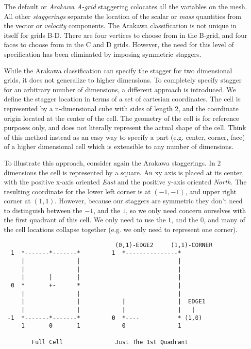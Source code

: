 The default or {\em{Arakawa A-grid}} staggering colocates all the variables on the mesh. All other {\em{staggerings}} separate the location of the scalar or {\em{mass}} quantities from the vector or {\em{velocity}} components. The Arakawa classification is not unique in itself for grids B-D. There are four vertices to choose from in the B-grid, and four faces to choose from in the C and D grids. However, the need for this level of specification has been eliminated by imposing symmetric staggers.

While the Arakawa classification can specify the stagger for two dimensional grids, it does not generalize to higher dimensions. To completely specify stagger for an arbitrary number of dimensions, a different approach is introduced. We define the stagger location in terms of a set of cartesian coordinates. The cell is represented by a n-dimensional cube with sides of length 2, and the coordinate origin located at the center of the cell. The geometry of the cell is for reference purposes only, and does not literally represent the actual shape of the cell. Think of this method instead as an easy way to specify a part (e.g. center, corner, face) of a higher dimensional cell which is extensible to any number of dimensions. 

To illustrate this approach, consider again the Arakawa staggerings. In 2 dimensions the cell is represented by a square. An xy axis is placed at its center, with the positive x-axis oriented {\em East} and the positive y-axis oriented {\em North}. The resulting coordinate for the lower left corner is at $(-1,-1)$, and upper right corner at $(1,1)$.
However, because our staggers are symmetric they don't need to distinguish between the $-1$, and the $1$, so
we only need concern ourselves with the first quadrant of this cell. We only need to use the $1$, and the $0$, and
many of the cell locations collapse together (e.g. we only need to represent one corner). 

\begin{verbatim}
                                (0,1)-EDGE2     (1,1)-CORNER
  1  *-------*-------*         1  *---------------* 
     |               |                            |
     |               |                            | 
     |       |       |                            | 
  0  *       +-      *                            |  
     |               |                            | 
     |               |            |               |  EDGE1
     |               |            |               |   |
 -1  *-------*-------*         0  *----           * (1,0)
    -1       0       1            0               1

        Full Cell               Just The 1st Quadrant
                                
\end{verbatim}


